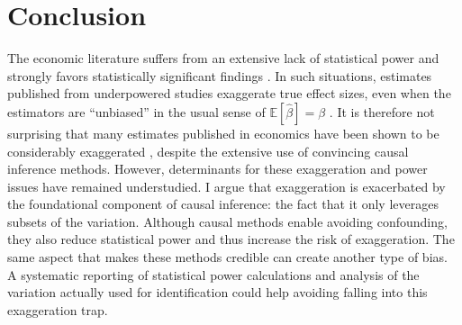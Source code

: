 \documentclass[usletter, 12pt]{article}
\begin{document}



\section{Conclusion} \label{conclusion}

	The economic literature suffers from an extensive lack of statistical power \citep{ioannidis_power_2017} and strongly favors statistically significant findings \citep[for instance]{rosenthal_file_1979, andrews_identification_2019, abadie_statistical_2020, brodeur_methods_2020}. In such situations, estimates published from underpowered studies exaggerate true effect sizes, even when the estimators are ``unbiased'' in the usual sense of $\mathbb{E}[\hat{\beta}] = \beta$ \citep{gelmanType2000, ioannidis_why_2008, gelman_beyond_2014}. It is therefore not surprising that many estimates published in economics have been shown to be considerably exaggerated \citep{camerer_evaluating_2016, ioannidis_power_2017}, despite the extensive use of convincing causal inference methods.  However, determinants for these exaggeration and power issues have remained understudied. I argue that exaggeration is exacerbated by the foundational component of causal inference: the fact that it only leverages subsets of the variation. Although causal methods enable avoiding confounding, they also reduce statistical power and thus increase the risk of exaggeration. The same aspect that makes these methods credible can create another type of bias. A systematic reporting of statistical power calculations and analysis of the variation actually used for identification could help avoiding falling into this exaggeration trap.


\end{document}
